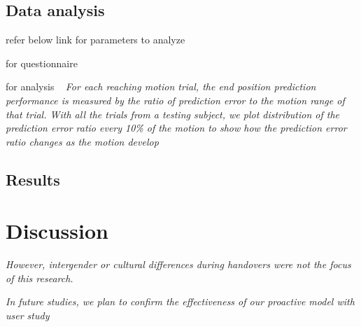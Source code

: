 \subsection{Data analysis}
refer below link for parameters to analyze

for questionnaire
~\cite{huber2009evaluation, bussy2013approche, qin2013effect, weiss2009addressing}

for analysis
~\cite{li2015predicting} \textit{For each reaching motion trial, the end position
	prediction performance is measured by the ratio of prediction
	error to the motion range of that trial. With all the trials from
	a testing subject, we plot distribution of the prediction error
	ratio every 10\% of the motion to show how the prediction
	error ratio changes as the motion develop}


\subsection{Results}



\clearpage


\section{Discussion}

\textit{However, intergender or cultural differences during handovers were not the
	focus of this research.}


\textit{In future studies, we plan to confirm the effectiveness of our proactive model with user study}


\clearpage



